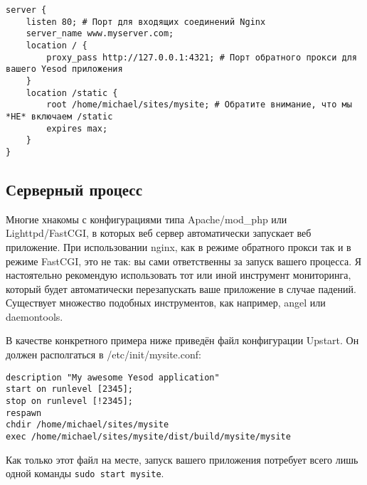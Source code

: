\begin{lstlisting}
server {
    listen 80; # Порт для входящих соединений Nginx
    server_name www.myserver.com;
    location / {
        proxy_pass http://127.0.0.1:4321; # Порт обратного прокси для вашего Yesod приложения
    }
    location /static {
        root /home/michael/sites/mysite; # Обратите внимание, что мы *НЕ* включаем /static
        expires max;
    }
}
\end{lstlisting}
%
\subsection{Серверный процесс}

%
%
Многие хнакомы с конфигурациями типа Apache/mod\_php или Lighttpd/FastCGI, в которых веб сервер автоматически запускает веб приложение. При использовании nginx, как в режиме обратного прокси так и в режиме FastCGI, это не так: вы сами ответственны за запуск вашего процесса. Я настоятельно рекомендую использовать тот или иной инструмент мониторинга, который будет автоматически перезапускать ваше приложение в случае падений. Существует множество подобных инструментов, как например, angel или daemontools.

В качестве конкретного примера ниже приведён файл конфигурации Upstart. Он должен располгаться в /etc/init/mysite.conf:
\begin{lstlisting}
description "My awesome Yesod application"
start on runlevel [2345];
stop on runlevel [!2345];
respawn
chdir /home/michael/sites/mysite
exec /home/michael/sites/mysite/dist/build/mysite/mysite
\end{lstlisting}
%
Как только этот файл на месте, запуск вашего приложения потребует всего лишь одной команды \lstinline{sudo start mysite}.
%
